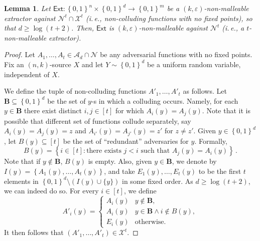 \documentclass[11pt]{article}
\numberwithin{equation}{section}
\newtheorem{lemma}[theorem]{Lemma}
\theoremstyle{definition}
\theoremstyle{plain}
\newcommand{\ie}{i.\,e.}
\newcommand{\ext}{\mathsf{Ext}}
\newcommand{\eps}{\varepsilon}
\newcommand{\set}[1]{\left\{{#1}\right\}}
\newcommand{\B}{\set{0,1}}
\begin{document}
\begin{lemma}\label{lem:nm-with-coll} 
Let $\ext \colon \B^{n} \times \B^{d} \rightarrow \B^{m}$ be a $(k,\eps)$-non-malleable
extractor against $\mathcal{N}^{t} \cap \mathcal{X}^{t}$ (\ie, non-colluding functions
with no fixed points), so that $d \ge \log (t + 2)$. Then, $\ext$ is $(k,\eps)$-non-malleable
against $\mathcal{N}^{t}$ (\ie, a $t$-non-malleable extractor).
\end{lemma}
\begin{proof}
Let $A_1,\ldots,A_t \in \mathcal{A}_d \cap \mathcal{N}$ be any adversarial
functions with no fixed points. 
Fix an $(n,k)$-source $X$ and let $Y \sim \B^d$ be a uniform random variable,
independent of $X$.

We define the tuple of non-colluding functions
$A'_1,\ldots,A'_t$ as follows. Let $\mathbf{B} \subseteq \B^d$ be the set of $y$-s 
in which a colluding occurs. Namely, for each $y \in \mathbf{B}$ there exist distinct $i,j \in [t]$
for which $A_{i}(y)=A_{j}(y)$. Note that it is possible that different set of functions collude
separately, say $A_{i}(y)=A_{j}(y) = z$ and $A_{i'}(y)=A_{j'}(y) = z'$ for $z \neq z'$.
Given $y \in \B^d$, let $B(y) \subseteq [t]$ be the set of ``redundant'' 
adversaries for $y$. Formally, 
\[
B(y) = \set{i \in [t]: \text{there exists $j < i$ such that $A_{j}(y)=A_{i}(y)$}}\,.
\]
Note that if $y \notin \mathbf{B}$, $B(y)$ is empty. 
Also, given $y \in \mathbf{B}$, we denote by $I(y) = \set{A_{1}(y),\ldots,A_{t}(y)}$, and
take $E_1(y),\ldots,E_{t}(y)$ to be the first $t$ elements in $\B^{d} \setminus (I(y) \cup \{y\})$ in some fixed order.  
As $d \ge \log( t + 2)$, we can indeed do so. For every $i \in [t]$, we define
\[
A'_{i}(y) = 
\begin{cases}
A_{i}(y) & y \notin \mathbf{B}, \\
A_{i}(y) & y \in \mathbf{B} \wedge i \notin B(y), \\
E_{i}(y) & \text{otherwise}.
\end{cases}
\]
It then follows that $\left( A'_1,\ldots,A'_t \right) \in \mathcal{X}^t$. 


\end{proof}
\end{document}
